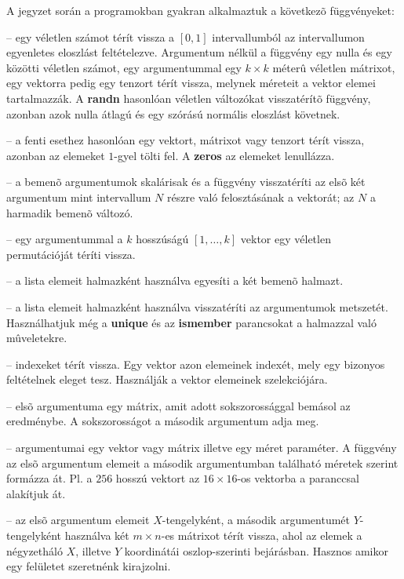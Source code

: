 A jegyzet során a programokban gyakran alkalmaztuk a következõ függvényeket:
\begin{description}
    \setlength{\itemsep}{0.04mm}
    \item[rand] -- egy véletlen számot térít vissza a $[0,1]$ intervallumból az intervallumon egyenletes eloszlást feltételezve. Argumentum nélkül a függvény egy nulla és egy közötti véletlen számot, egy argumentummal egy $k\times k$ méterû véletlen mátrixot, egy vektorra pedig egy tenzort térít vissza, melynek méreteit a vektor elemei tartalmazzák. A {\bf randn} hasonlóan véletlen változókat visszatérítõ függvény, azonban azok nulla átlagú és egy szórású normális eloszlást követnek.
    \item[ones] -- a fenti esethez hasonlóan egy vektort, mátrixot vagy tenzort térít vissza, azonban az elemeket $1$-gyel tölti fel. A {\bf zeros} az elemeket lenullázza.
    \item[linspace] -- a bemenõ argumentumok skalárisak és a függvény visszatéríti az elsõ két argumentum mint intervallum $N$ részre való felosztásának a vektorát; az $N$ a harmadik bemenõ változó.
    \item[randperm] -- egy argumentummal a $k$ hosszúságú $[1,\ldots,k]$ vektor egy véletlen permutációját téríti vissza.
    \item[union] -- a lista elemeit halmazként használva egyesíti a két bemenõ halmazt.
    \item[setdiff] -- a lista elemeit halmazként használva visszatéríti az argumentumok metszetét. Használhatjuk még a {\bf unique} és az {\bf ismember} parancsokat a halmazzal való mûveletekre.
    \item[find] -- indexeket térít vissza. Egy vektor azon elemeinek indexét, mely egy bizonyos feltételnek eleget tesz. Használják a vektor elemeinek szelekciójára.
    \item[repmat] -- elsõ argumentuma egy mátrix, amit adott sokszorossággal bemásol az eredménybe. A sokszorosságot a második argumentum adja meg.
    \item[reshape] -- argumentumai egy vektor vagy mátrix illetve egy méret paraméter. A függvény az elsõ argumentum elemeit a második argumentumban található méretek szerint formázza át. Pl. a  $256$ hosszú vektort az  $16\times 16$-os vektorba a  paranccsal alakítjuk át.
    \item[meshgrid] -- az elsõ argumentum elemeit $X$-tengelyként, a második argumentumét $Y$-tengelyként használva két $m\times n$-es mátrixot térít vissza, ahol az elemek a négyzetháló $X$, illetve $Y$ koordinátái oszlop-szerinti bejárásban. Hasznos amikor egy felületet szeretnénk kirajzolni.

\end{description}

